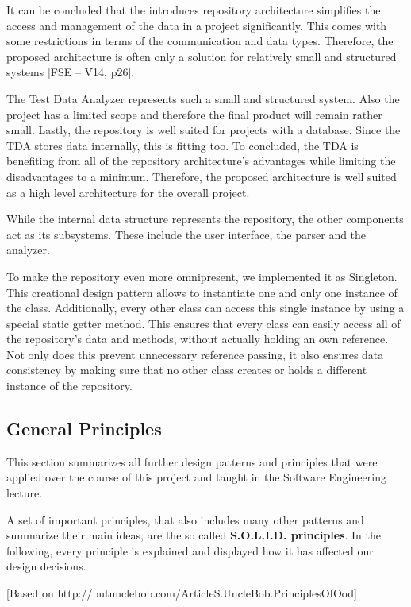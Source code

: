 It can be concluded that the introduces repository architecture simplifies the access and management of the data in a project significantly. This comes with some restrictions in terms of the communication and data types. Therefore, the proposed architecture is often only a solution for relatively small and structured systems [FSE – V14, p26].

The Test Data Analyzer represents such a small and structured system. Also the project has a limited scope and therefore the final product will remain rather small. Lastly, the repository is well suited for projects with a database. Since the TDA stores data internally, this is fitting too. To concluded, the TDA is benefiting from all of the repository architecture's advantages while limiting the disadvantages to a minimum. Therefore, the proposed architecture is well suited as a high level architecture for the overall project.

While the internal data structure represents the repository, the other components act as its subsystems. These include the user interface, the parser and the analyzer.

To make the repository even more omnipresent, we implemented it as Singleton. This creational design pattern allows to instantiate one and only one instance of the class. Additionally, every other class can access this single instance by using a special static getter method. This ensures that every class can easily access all of the repository's data and methods, without actually holding an own reference. Not only does this prevent unnecessary reference passing, it also ensures data consistency by making sure that no other class creates or holds a different instance of the repository.

\subsection{General Principles}

This section summarizes all further design patterns and principles that were applied over the course of this project and taught in the Software Engineering lecture.

A set of important principles, that also includes many other patterns and summarize their main ideas, are the so called \textbf{S.O.L.I.D. principles}. In the following, every principle is explained and displayed how it has affected our design decisions.

[Based on http://butunclebob.com/ArticleS.UncleBob.PrinciplesOfOod]

